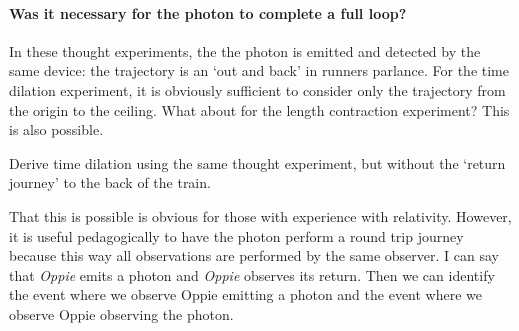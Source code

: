 \begin{subappendices}
\paragraph{Was it necessary for the photon to complete a full loop?} In these thought experiments, the the photon is emitted and detected by the same device: the trajectory is an `out and back' in runners parlance. For the time dilation experiment, it is obviously sufficient to consider only the trajectory from the origin to the ceiling. What about for the length contraction experiment? This is also possible. 
\begin{exercise}
Derive time dilation using the same thought experiment, but without the `return journey' to the back of the train. 
\end{exercise}
That this is possible is obvious for those with experience with relativity. However, it is useful pedagogically to have the photon perform a round trip journey because this way all observations are performed by the same observer. I can say that \emph{Oppie} emits a photon and \emph{Oppie} observes its return. Then we can identify the event where we observe Oppie emitting a photon and the event where we observe Oppie observing the photon.


\end{subappendices}
